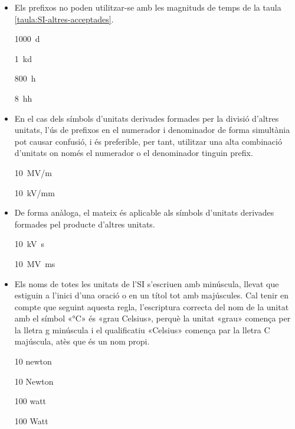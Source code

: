 \begin{itemize}
\textcolor{Green}\faCheckSquare{} El nombre de partícules és de \qty[per-mode = symbol]{5e6}{\per\cubic\metre}

\textcolor{Red}\faTimesCircle{} El nombre de partícules és de \qty{5}{M\,/m^3}


\item Els prefixos no poden utilitzar-se amb les magnituds  de temps de la taula \vref{taula:SI-altres-acceptades}.

\textcolor{Green}\faCheckSquare{} \qty{1000}{d}

\textcolor{Red}\faTimesCircle{}  \qty{1}{kd}

\textcolor{Green}\faCheckSquare{} \qty{800}{h}

\textcolor{Red}\faTimesCircle{}  \qty{8}{hh}


\item En el cas dels símbols d'unitats derivades formades per la divisió
d'altres unitats, l'ús de prefixos en el numerador i denominador de
forma simultània pot causar confusió, i és preferible, per tant,
utilitzar una alta combinació d'unitats on només el numerador o el
denominador tinguin prefix.

\textcolor{Green}\faCheckSquare{} \qty{10}{MV/m}

\textcolor{Blue}\faExclamationTriangle{}  \qty{10}{kV/mm}


\item De forma anàloga, el mateix és aplicable als símbols d'unitats
derivades formades pel producte d'altres unitats.

\textcolor{Green}\faCheckSquare{} \qty{10}{kV.s}

\textcolor{Blue}\faExclamationTriangle{}  \qty{10}{MV.ms}


\item Els noms de totes les unitats de l'SI s'escriuen amb minúscula, llevat que estiguin a l'inici d'una oració o en un títol tot amb majúscules. Cal tenir en compte que seguint aquesta regla, l'escriptura  correcta
del nom de la unitat amb el símbol «\unit{\degreeCelsius}» és «grau Celsius», perquè la unitat  «grau» comença per la lletra g  minúscula i el qualificatiu «Celsius» comença par la lletra C  majúscula, atès que és un nom propi.


\textcolor{Green}\faCheckSquare{} 10 newton

\textcolor{Red}\faTimesCircle{} 10 Newton

\textcolor{Green}\faCheckSquare{}  100 watt

\textcolor{Red}\faTimesCircle{} 100 Watt


\end{itemize}
